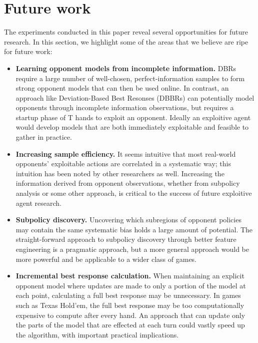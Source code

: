\documentclass{aamas2013}
\begin{document}
\section{Future work}
The experiments conducted in this paper reveal several opportunities for future research. In this section, we highlight some of the areas that we believe are ripe for future work:

\begin{itemize}
\item \textbf{Learning opponent models from incomplete information.} DBRs \cite{dbr} require a large number of well-chosen, perfect-information samples to form strong opponent models that can then be used online. In contrast, an approach like Deviation-Based Best Resonses (DBBRs) \cite{dbbr} can potentially model opponents through incomplete information observations, but requires a startup phase of T hands to exploit an opponent. Ideally an exploitive agent would develop models that are both immediately exploitable and feasible to gather in practice.

\item \textbf{Increasing sample efficiency.} It seems intuitive that most real-world opponents' exploitable actions are correlated in a systematic way; this intuition has been noted by other researchers \cite{shortterm} as well. Increasing the information derived from opponent observations, whether from subpolicy analysis or some other approach, is critical to the success of future exploitive agent research.

\item \textbf{Subpolicy discovery.} Uncovering which subregions of opponent policies may contain the same systematic bias holds a large amount of potential. The straight-forward approach to subpolicy discovery through better feature engineering is a pragmatic approach, but a more general approach would be more powerful and be applicable to a wider class of games.

\item \textbf{Incremental best response calculation.} When maintaining an explicit opponent model where updates are made to only a portion of the model at each point, calculating a full best response may be unnecessary. In games such as Texas Hold'em, the full best response may be too computationally expensive to compute after every hand. An approach that can update only the parts of the model that are effected at each turn could vastly speed up the algorithm, with important practical implications.


\end{itemize}
\end{document}
